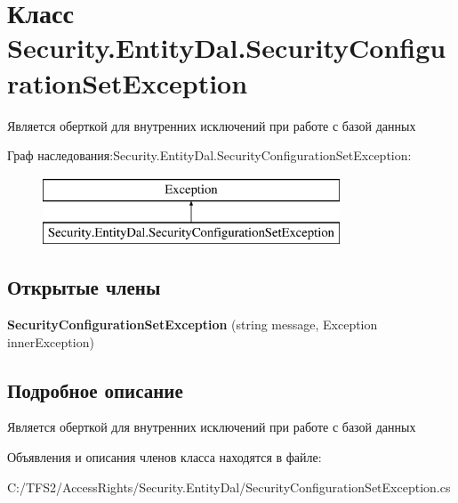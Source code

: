 \hypertarget{class_security_1_1_entity_dal_1_1_security_configuration_set_exception}{}\section{Класс Security.\+Entity\+Dal.\+Security\+Configuration\+Set\+Exception}
\label{class_security_1_1_entity_dal_1_1_security_configuration_set_exception}


Является оберткой для внутренних исключений при работе с базой данных  


Граф наследования\+:Security.\+Entity\+Dal.\+Security\+Configuration\+Set\+Exception\+:\begin{figure}[H]
\begin{center}
\leavevmode
\includegraphics[height=2.000000cm]{d1/d91/class_security_1_1_entity_dal_1_1_security_configuration_set_exception}
\end{center}
\end{figure}
\subsection*{Открытые члены}
\begin{DoxyCompactItemize}
\item 
\mbox{\label{class_security_1_1_entity_dal_1_1_security_configuration_set_exception_afb5b208b33c6322c76783c1cba7d84d5}} 
{\bfseries Security\+Configuration\+Set\+Exception} (string message, Exception inner\+Exception)
\end{DoxyCompactItemize}


\subsection{Подробное описание}
Является оберткой для внутренних исключений при работе с базой данных 



Объявления и описания членов класса находятся в файле\+:\begin{DoxyCompactItemize}
\item 
C\+:/\+T\+F\+S2/\+Access\+Rights/\+Security.\+Entity\+Dal/Security\+Configuration\+Set\+Exception.\+cs\end{DoxyCompactItemize}
